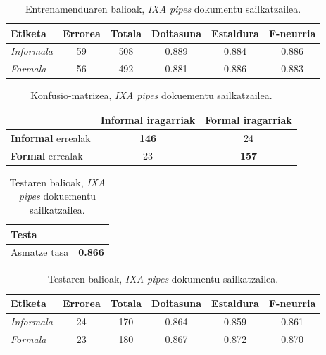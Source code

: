 \documentclass[information,article,submit,moreauthors,pdftex,10pt,a4paper]{Definitions/mdpi}
\begin{document}
\begin{table}[H]
  \centering
  \begin{tabular}{|l|c|c|c|c|c|}
    \hline
    \textbf{Etiketa} & \textbf{Errorea} & \textbf{Totala} & \textbf{Doitasuna} & \textbf{Estaldura} & \textbf{F-neurria}\\ \hline 
    \textit{Informala} &  59 & 508 & 0.889  & 0.884  & 0.886\\ \hline 
    \textit{Formala} &  56 & 492 & 0.881 & 0.886 & 0.883\\ \hline
  \end{tabular}
  \caption{Entrenamenduaren balioak, \textit{IXA pipes} dokumentu sailkatzailea.}
  \label{tab:ixa-ml-garapen}
\end{table}

\begin{table}[H]
  \centering
  \begin{tabular}{|l|c|c|}
    \hline  
    & \textbf{Informal} iragarriak & \textbf{Formal} iragarriak \\ \hline 
    \textbf{Informal} errealak & \textbf{146} & 24\\ \hline
    \textbf{Formal} errealak & 23 & \textbf{157}\\ \hline
  \end{tabular}
  \caption{Konfusio-matrizea, \textit{IXA pipes} dokuementu sailkatzailea.}
  \label{tab:ixa-ml-cm}
\end{table}

\begin{table}[H]
  \centering
  \begin{tabular}{|l|r|}
    \hline
    \textbf{Testa} &  \\ \hline 
    Asmatze tasa & \textbf{0.866} \\ \hline
  \end{tabular}
  \caption{Testaren balioak, \textit{IXA pipes} dokuementu sailkatzailea.}
  \label{tab:Test ixa}
\end{table}

\begin{table}[H]
  \centering
  \begin{tabular}{|l|c|c|c|c|c|}
    \hline
    \textbf{Etiketa} & \textbf{Errorea} & \textbf{Totala} & \textbf{Doitasuna} & \textbf{Estaldura} & \textbf{F-neurria}\\ \hline 
    \textit{Informala} &  24 & 170 & 0.864  & 0.859  & 0.861\\ \hline 
    \textit{Formala} &  23 & 180 & 0.867 & 0.872 & 0.870\\ \hline
  \end{tabular}
  \caption{Testaren balioak, \textit{IXA pipes} dokumentu sailkatzailea.}
  \label{tab:ixa-ml-test}
\end{table}
\end{document}
